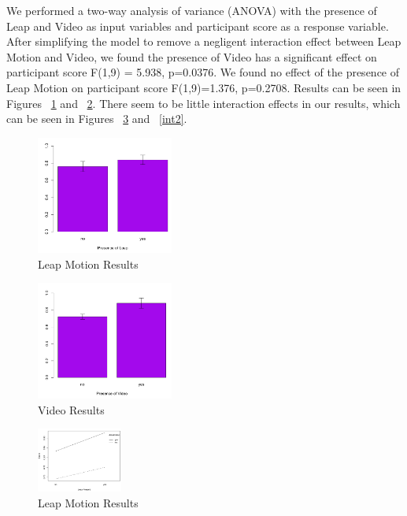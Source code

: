 \documentclass{sigchi}
\begin{document}
We performed a two-way analysis of variance (ANOVA) with the presence of Leap and Video as input variables and participant score as a response variable.  After simplifying the model to remove a negligent interaction effect between Leap Motion and Video, we found the presence of Video has a significant effect on participant score F(1,9) = 5.938, p=0.0376.  We found no effect of the presence of Leap Motion on participant score F(1,9)=1.376, p=0.2708.  Results can be seen in Figures ~\ref{leapANOVA} and ~\ref{videoANOVA}.  There seem to be little interaction effects in our results, which can be seen in Figures ~\ref{int1} and ~\ref{int2}.

\begin{figure}
\centering
\includegraphics[width=0.4\textwidth]{leapANOVA.png}
\caption{Leap Motion Results}
\label{leapANOVA}
\end{figure}

\begin{figure}
\centering
\includegraphics[width=0.4\textwidth]{videoANOVA.png}
\caption{Video Results}
\label{videoANOVA}
\end{figure}
\begin{figure}
\centering
\includegraphics[width=0.25\textwidth]{int1.png}
\caption{Leap Motion Results}
\label{int1}
\end{figure}
\end{document}
